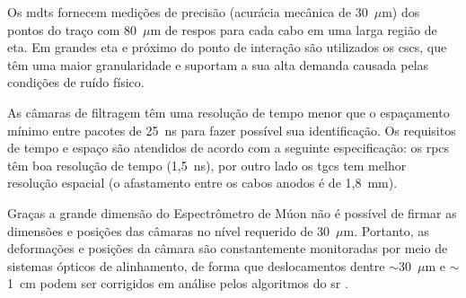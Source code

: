 Os \glspl{mdt} fornecem medições de precisão (acurácia mecânica de 30~$\mu$m) 
dos pontos do traço com 80~$\mu$m de \gls{respos}
para cada cabo em uma larga região de \gls{eta}. Em grandes \gls{eta} e próximo
do ponto de interação são utilizados os \glspl{csc}, que têm uma maior
granularidade e suportam a sua alta demanda causada pelas condições de ruído
físico.
 
As câmaras de filtragem têm uma resolução de tempo menor que o espaçamento
mínimo entre pacotes de 25~ns para fazer possível sua identificação. Os
requisitos de tempo e espaço são atendidos de acordo com a seguinte
especificação: os \glspl{rpc} têm boa resolução de tempo (1,5~ns), por outro
lado os \glspl{tgc} tem melhor resolução espacial 
(o afastamento entre os cabos anodos é de 1,8~mm).

Graças a grande dimensão do Espectrômetro de Múon não é possível de firmar as
dimensões e posições das câmaras no nível requerido de 30~$\mu$m. Portanto, as
deformações e posições da câmara são constantemente monitoradas por meio de
sistemas ópticos de alinhamento, de forma que deslocamentos dentre $\sim$30~$\mu$m e $\sim$1~cm 
podem ser corrigidos em análise pelos algoritmos do
\glsdesc{sr} \cite{muon_tdr}.










